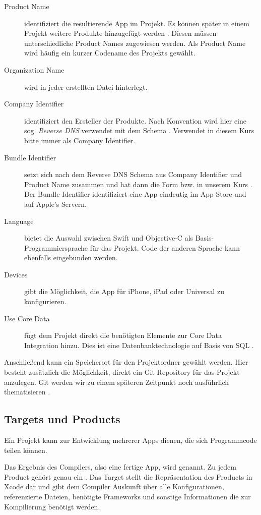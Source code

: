 \documentclass[parskip=half, final]{scrreprt}
\begin{document}
\begin{description}
\item[Product Name] identifiziert die resultierende App im Projekt. Es können später in einem Projekt weitere Produkte hinzugefügt werden . Diesen müssen unterschiedliche Product Names zugewiesen werden. Als Product Name wird häufig ein kurzer Codename des Projekts gewählt.
\item[Organization Name] wird in jeder erstellten Datei hinterlegt.
\item[Company Identifier] identifiziert den Ersteller der Produkte. Nach Konvention wird hier eine sog. \emph{Reverse DNS} verwendet mit dem Schema . Verwendet in diesem Kurs bitte immer  als Company Identifier.
\item[Bundle Identifier] setzt sich nach dem Reverse DNS Schema aus Company Identifier und Product Name zusammen und hat dann die Form  bzw. in unserem Kurs . Der Bundle Identifier identifiziert eine App eindeutig im App Store und auf Apple's Servern.
\item[Language] bietet die Auswahl zwischen Swift und Objective-C als Basis-Programmiersprache für das Projekt. Code der anderen Sprache kann ebenfalls eingebunden werden.
\item[Devices] gibt die Möglichkeit, die App für iPhone, iPad oder Universal zu konfigurieren.
\item[Use Core Data] fügt dem Projekt direkt die benötigten Elemente zur Core Data Integration hinzu. Dies ist eine Datenbanktechnologie auf Basis von SQL .
\end{description}

Anschließend kann ein Speicherort für den Projektordner gewählt werden. Hier besteht zusätzlich die Möglichkeit, direkt ein Git Repository für das Projekt anzulegen. Git werden wir zu einem späteren Zeitpunkt noch ausführlich thematisieren .

\subsection{Targets und Products}\label{sec:targets}

Ein Projekt kann zur Entwicklung mehrerer Apps dienen, die sich Programmcode teilen können.

Das Ergebnis des Compilers, also eine fertige App, wird  genannt. Zu jedem Product gehört genau ein . Das Target stellt die Repräsentation des Products in Xcode dar und gibt dem Compiler Auskunft über alle Konfigurationen, referenzierte Dateien, benötigte Frameworks und sonstige Informationen die zur Kompilierung benötigt werden.
\end{document}
